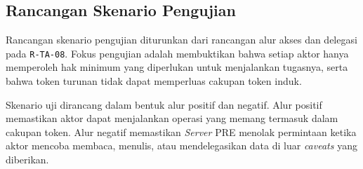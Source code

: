 \subsection{Rancangan Skenario Pengujian}
\label{subsec:rancangan-skenario-pengujian}

Rancangan skenario pengujian diturunkan dari rancangan alur akses dan delegasi pada \texttt{R-TA-08}. Fokus pengujian adalah membuktikan bahwa setiap aktor hanya memperoleh hak minimum yang diperlukan untuk menjalankan tugasnya, serta bahwa token turunan tidak dapat memperluas cakupan token induk.

Skenario uji dirancang dalam bentuk alur positif dan negatif. Alur positif memastikan aktor dapat menjalankan operasi yang memang termasuk dalam cakupan token. Alur negatif memastikan \textit{Server} PRE menolak permintaan ketika aktor mencoba membaca, menulis, atau mendelegasikan data di luar \textit{caveats} yang diberikan.

